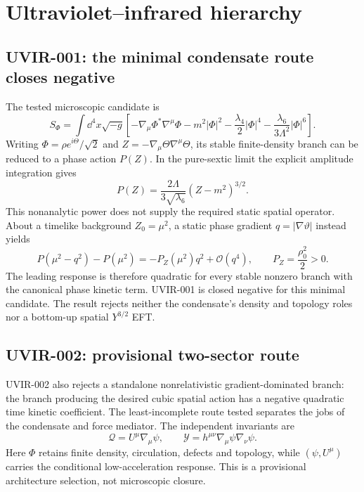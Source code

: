 \section{Ultraviolet--infrared hierarchy}

\subsection{UVIR-001: the minimal condensate route closes negative}

The tested microscopic candidate is
\begin{equation}
 S_\Phi=\int \dd^4x\sqrt{-g}\left[
 -\nabla_\mu\Phi^*\nabla^\mu\Phi
 -m^2|\Phi|^2
 -\frac{\lambda_4}{2}|\Phi|^4
 -\frac{\lambda_6}{3\Lambda^2}|\Phi|^6\right].
 \label{eq:candidate-uv}
\end{equation}
Writing $\Phi=\rho e^{i\Theta}/\sqrt2$ and
$Z=-\nabla_\mu\Theta\nabla^\mu\Theta$, its stable finite-density branch can
be reduced to a phase action $P(Z)$.  In the pure-sextic limit the explicit
amplitude integration gives
\begin{equation}
 P(Z)=\frac{2\Lambda}{3\sqrt{\lambda_6}}(Z-m^2)^{3/2}.
 \label{eq:sextic-pz}
\end{equation}
This nonanalytic power does not supply the required static spatial operator.
About a timelike background $Z_0=\mu^2$, a static phase gradient
$q=|\nabla\vartheta|$ instead yields
\begin{equation}
 P(\mu^2-q^2)-P(\mu^2)=-P_Z(\mu^2)q^2+\mathcal O(q^4),
 \qquad P_Z=\frac{\rho_0^2}{2}>0.
 \label{eq:uvir001-static}
\end{equation}
The leading response is therefore quadratic for every stable nonzero branch
with the canonical phase kinetic term.  UVIR-001 is closed negative for this
minimal candidate.  The result rejects neither the condensate's density and
topology roles nor a bottom-up spatial $Y^{3/2}$ EFT.

\subsection{UVIR-002: provisional two-sector route}

UVIR-002 also rejects a standalone nonrelativistic gradient-dominated branch:
the branch producing the desired cubic spatial action has a negative quadratic
time kinetic coefficient.  The least-incomplete route tested separates the
jobs of the condensate and force mediator.  The independent invariants are
\begin{equation}
 \mathcal Q=U^\mu\nabla_\mu\psi,
 \qquad
 \mathcal Y=h^{\mu\nu}\nabla_\mu\psi\nabla_\nu\psi.
 \label{eq:preferred-invariants}
\end{equation}
Here $\Phi$ retains finite density, circulation, defects and topology, while
$(\psi,U^\mu)$ carries the conditional low-acceleration response.  This is a
provisional architecture selection, not microscopic closure.

